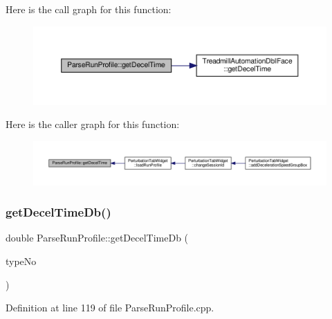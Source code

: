 Here is the call graph for this function\+:
\nopagebreak
\begin{figure}[H]
\begin{center}
\leavevmode
\includegraphics[width=350pt]{class_parse_run_profile_a212d5f9f986c03745be41a5fe610ea8e_cgraph}
\end{center}
\end{figure}
Here is the caller graph for this function\+:
\nopagebreak
\begin{figure}[H]
\begin{center}
\leavevmode
\includegraphics[width=350pt]{class_parse_run_profile_a212d5f9f986c03745be41a5fe610ea8e_icgraph}
\end{center}
\end{figure}
\mbox{\label{class_parse_run_profile_a02fea0744103223c7b7462a5a2054c52}} 
\subsubsection{\texorpdfstring{get\+Decel\+Time\+Db()}{getDecelTimeDb()}}
{\footnotesize\ttfamily double Parse\+Run\+Profile\+::get\+Decel\+Time\+Db (\begin{DoxyParamCaption}\item[{Q\+String}]{type\+No }\end{DoxyParamCaption})}



Definition at line 119 of file Parse\+Run\+Profile.\+cpp.

